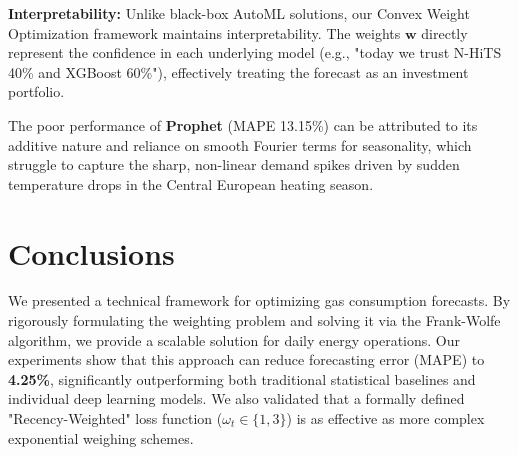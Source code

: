 \documentclass[journal,article,submit,pdftex,moreauthors]{Definitions/mdpi}
\begin{document}
\textbf{Interpretability:} Unlike black-box AutoML solutions, our Convex Weight Optimization framework maintains interpretability. The weights $\mathbf{w}$ directly represent the confidence in each underlying model (e.g., "today we trust N-HiTS 40\% and XGBoost 60\%"), effectively treating the forecast as an investment portfolio.

The poor performance of \textbf{Prophet} (MAPE 13.15\%) can be attributed to its additive nature and reliance on smooth Fourier terms for seasonality, which struggle to capture the sharp, non-linear demand spikes driven by sudden temperature drops in the Central European heating season.

\section{Conclusions}

We presented a technical framework for optimizing gas consumption forecasts. By rigorously formulating the weighting problem and solving it via the Frank-Wolfe algorithm, we provide a scalable solution for daily energy operations. Our experiments show that this approach can reduce forecasting error (MAPE) to \textbf{4.25\%}, significantly outperforming both traditional statistical baselines and individual deep learning models. We also validated that a formally defined "Recency-Weighted" loss function ($\omega_t \in \{1, 3\}$) is as effective as more complex exponential weighing schemes.

\vspace{6pt} 





\end{document}
